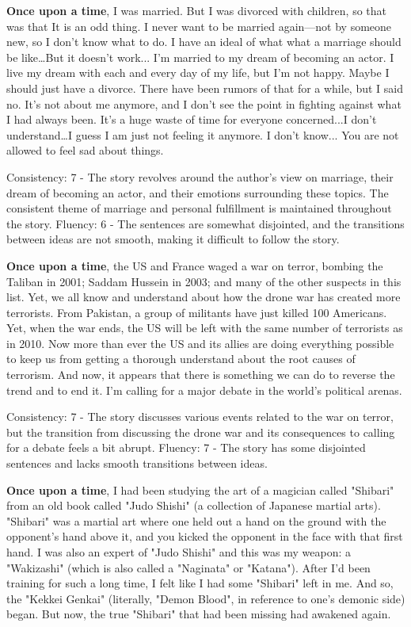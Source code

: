 \documentclass{article}
\begin{document}
\textbf{Once upon a time}, I was married. But I was divorced with children, so that was that It is an odd thing. I never want to be married again—not by someone new, so I don't know what to do. I have an ideal of what what a marriage should be like…But it doesn't work... I'm married to my dream of becoming an actor. I live my dream with each and every day of my life, but I'm not happy. Maybe I should just have a divorce. There have been rumors of that for a while, but I said no. It's not about me anymore, and I don't see the point in fighting against what I had always been. It's a huge waste of time for everyone concerned...I don't understand…I guess I am just not feeling it anymore. I don't know... You are not allowed to feel sad about things.

Consistency: 7 - The story revolves around the author's view on marriage, their dream of becoming an actor, and their emotions surrounding these topics. The consistent theme of marriage and personal fulfillment is maintained throughout the story.
Fluency: 6 - The sentences are somewhat disjointed, and the transitions between ideas are not smooth, making it difficult to follow the story.

\textbf{Once upon a time}, the US and France waged a war on terror, bombing the Taliban in 2001; Saddam Hussein in 2003; and many of the other suspects in this list. Yet, we all know and understand about how the drone war has created more terrorists. From Pakistan, a group of militants have just killed 100 Americans. Yet, when the war ends, the US will be left with the same number of terrorists as in 2010. Now more than ever the US and its allies are doing everything possible to keep us from getting a thorough understand about the root causes of terrorism. And now, it appears that there is something we can do to reverse the trend and to end it. I'm calling for a major debate in the world's political arenas.

Consistency: 7 - The story discusses various events related to the war on terror, but the transition from discussing the drone war and its consequences to calling for a debate feels a bit abrupt.
Fluency: 7 - The story has some disjointed sentences and lacks smooth transitions between ideas.

\textbf{Once upon a time}, I had been studying the art of a magician called "Shibari" from an old book called "Judo Shishi" (a collection of Japanese martial arts). "Shibari" was a martial art where one held out a hand on the ground with the opponent's hand above it, and you kicked the opponent in the face with that first hand. I was also an expert of "Judo Shishi" and this was my weapon: a "Wakizashi" (which is also called a "Naginata" or "Katana"). After I'd been training for such a long time, I felt like I had some "Shibari" left in me.  And so, the "Kekkei Genkai" (literally, "Demon Blood", in reference to one's demonic side) began.  But now, the true "Shibari" that had been missing had awakened again.
\end{document}
